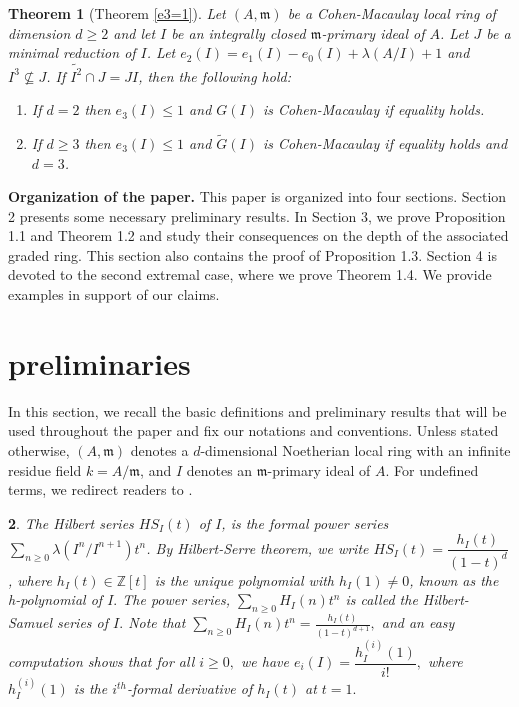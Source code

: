 \documentclass[11pt]{amsart}
\theoremstyle{plain}
\newtheorem{theorem}{Theorem}[section]
\newtheorem{point}[theorem]{}
\newcommand{\m}{\mathfrak{m}}
\newcommand{\wt}{\widetilde}
\theoremstyle{plain}
\begin{document}
\begin{theorem}[Theorem \ref{e3=1}]
    Let $(A, \m)$ be a Cohen-Macaulay local ring of dimension $d\geq2$ and let $I$ be an integrally closed $\m$-primary ideal of $A$. Let $J$ be a minimal reduction of $I$. Let $e_{2}(I)=e_{1}(I)-e_{0}(I)+\lambda(A/I)+1$ and $I^3\nsubseteq J$. If $\wt{I^2}\cap J=JI$, then the following hold:
    \begin{enumerate}[\normalfont(i)]
          \item If $d=2$ then $e_3(I)\leq 1$ and $G(I)$ is Cohen-Macaulay if equality holds.
        \item If $d\geq 3$ then $e_3(I)\leq 1$ and $\wt{G}(I)$ is Cohen-Macaulay if equality holds and $d=3$.
    \end{enumerate}
\end{theorem}


\textbf{Organization of the paper.} This paper is organized into four sections. Section 2 presents some necessary preliminary results. In Section 3, we prove Proposition 1.1 and Theorem 1.2 and study their consequences on the depth of the associated graded ring. This section also contains the proof of Proposition 1.3. Section 4 is devoted to the second extremal case, where we prove Theorem 1.4. We provide examples in support of our claims.




 
 











\section{preliminaries}

In this section, we recall the basic definitions and preliminary results that will be used throughout the paper and fix our notations and conventions. Unless stated otherwise, $(A,\mathfrak m)$ denotes a $d$-dimensional Noetherian local ring with an infinite residue field $k=A/\m$, and $I$ denotes an $\mathfrak m$-primary ideal of $A$. For undefined terms, we redirect readers to \cite{Bruns}.

\begin{point} \normalfont
    The \textit{Hilbert series} $HS_{I}(t)$ of $I$,  is the formal power series $\displaystyle \sum_{n \geq 0} \lambda(I^{n}/I^{n+1}) t^{n}$. 
    By Hilbert-Serre theorem, we write 
    $ HS_{I}(t)=\dfrac{h_{I}(t)}{(1-t)^{d}}$,
where $h_{I}(t) \in \mathbb{Z}[t]$ is the unique polynomial with $h_{I}(1) \neq 0$, known as the \textit{h-polynomial} of $I.$   The power series, $\displaystyle \sum_{n \geq 0} H_{I}(n)t^{n}$ is called the \textit{Hilbert-Samuel series} of $I.$ Note that $\displaystyle \sum_{n \geq 0} H_{I}(n)t^{n}=\frac{h_{I}(t)}{(1-t)^{d+1}},$
and an easy computation shows that for all $i \geq 0,$ we have $e_{i}(I)=\dfrac{h^{(i)}_{I}(1)}{i!},$
 where $h^{(i)}_{I}(1)$ is the $i^{th}$-formal derivative of $h_{I}(t)$ at $t=1.$
\end{point}
\end{document}
